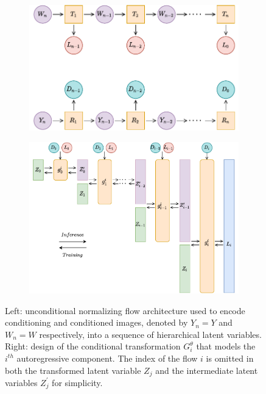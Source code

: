 \begin{figure}[t]
    \centering
    \begin{subfigure}{0.45\textwidth}
        \includegraphics[width=\textwidth]{Chapter1/figures/dual_glow.pdf}
    \end{subfigure}%
    \qquad 
    \begin{subfigure}{0.47\textwidth}
            \includegraphics[width=\textwidth]{Chapter1/figures/high_level_design_conditional_modified.pdf}
    \end{subfigure}
    \caption{Left: unconditional normalizing flow architecture used to encode conditioning and conditioned images, denoted by $Y_n = Y$ and $W_n = W$ respectively, into a sequence of hierarchical latent variables. Right: design of the conditional transformation $G_{i}^\theta$ that models the $i^{th}$ autoregressive component. The index of the flow $i$ is omitted in both the transformed latent variable $Z_j$ and the intermediate latent variables $Z_j^{\prime}$ for simplicity.}
           \label{ch1:fig:high_level_design_conditional}
\end{figure}

